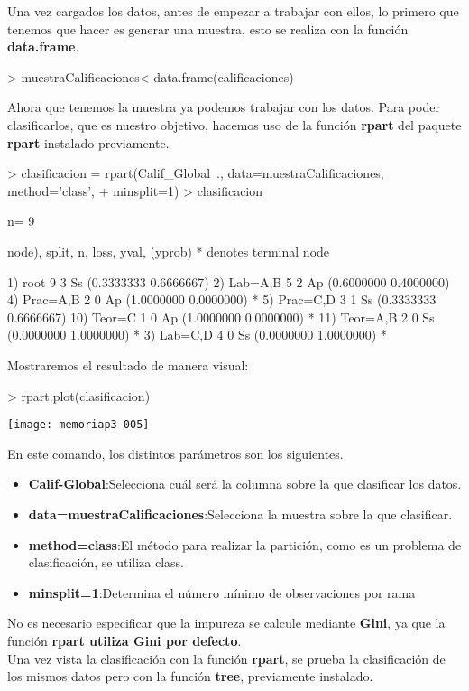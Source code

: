 \documentclass [a4paper] {article}
\begin{document}
Una vez cargados los datos, antes de empezar a trabajar con ellos, lo primero que tenemos que hacer es generar una muestra, 
esto se realiza con la función \textbf{data.frame}. 

\begin{Schunk}
\begin{Sinput}
> muestraCalificaciones<-data.frame(calificaciones)
\end{Sinput}
\end{Schunk}

Ahora que tenemos la muestra ya podemos trabajar con los datos. Para poder clasificarlos, que es nuestro objetivo, 
hacemos uso de la función \textbf{rpart} del paquete \textbf{rpart} instalado previamente.

\begin{Schunk}
\begin{Sinput}
> clasificacion = rpart(Calif_Global~., data=muestraCalificaciones, method='class',
+ minsplit=1)
> clasificacion
\end{Sinput}
\begin{Soutput}
n= 9 

node), split, n, loss, yval, (yprob)
      * denotes terminal node

 1) root 9 3 Ss (0.3333333 0.6666667)  
   2) Lab=A,B 5 2 Ap (0.6000000 0.4000000)  
     4) Prac=A,B 2 0 Ap (1.0000000 0.0000000) *
     5) Prac=C,D 3 1 Ss (0.3333333 0.6666667)  
      10) Teor=C 1 0 Ap (1.0000000 0.0000000) *
      11) Teor=A,B 2 0 Ss (0.0000000 1.0000000) *
   3) Lab=C,D 4 0 Ss (0.0000000 1.0000000) *
\end{Soutput}
\end{Schunk}

Mostraremos el resultado de manera visual:

\begin{Schunk}
\begin{Sinput}
> rpart.plot(clasificacion)
\end{Sinput}
\end{Schunk}
\texttt{[image: memoriap3-005]}

En este comando, los distintos parámetros son los siguientes.
\begin{itemize}
\item \textbf{Calif-Global}:Selecciona cuál será la columna sobre la que clasificar los datos.
\item \textbf{data=muestraCalificaciones}:Selecciona la muestra sobre la que clasificar.
\item \textbf{method=class}:El método para realizar la partición, como es un problema de clasificación, se utiliza class.
\item \textbf{minsplit=1}:Determina el número mínimo de observaciones por rama
\end{itemize}
No es necesario especificar que la impureza se calcule mediante \textbf{Gini}, ya que la función \textbf{rpart utiliza Gini por defecto}.\\
Una vez vista la clasificación con la función \textbf{rpart}, se prueba la clasificación de los mismos datos pero con la función 
\textbf{tree}, previamente instalado. 
\end{document}
